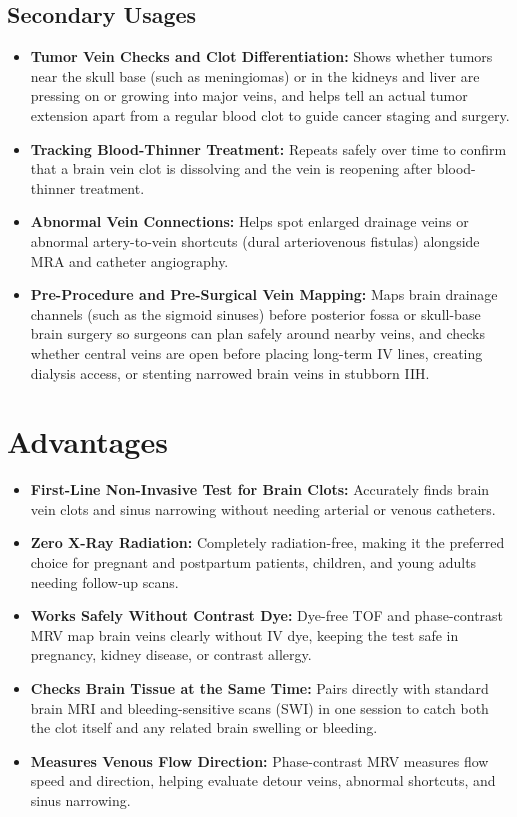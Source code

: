 \subsection{Secondary Usages}
\begin{itemize}
\item \textbf{Tumor Vein Checks and Clot Differentiation:} Shows whether tumors near the skull base (such as meningiomas) or in the kidneys and liver are pressing on or growing into major veins, and helps tell an actual tumor extension apart from a regular blood clot to guide cancer staging and surgery.
\item \textbf{Tracking Blood-Thinner Treatment:} Repeats safely over time to confirm that a brain vein clot is dissolving and the vein is reopening after blood-thinner treatment.
\item \textbf{Abnormal Vein Connections:} Helps spot enlarged drainage veins or abnormal artery-to-vein shortcuts (dural arteriovenous fistulas) alongside MRA and catheter angiography.
\item \textbf{Pre-Procedure and Pre-Surgical Vein Mapping:} Maps brain drainage channels (such as the sigmoid sinuses) before posterior fossa or skull-base brain surgery so surgeons can plan safely around nearby veins, and checks whether central veins are open before placing long-term IV lines, creating dialysis access, or stenting narrowed brain veins in stubborn IIH.
\end{itemize}

\section{Advantages}
\begin{itemize}
\item \textbf{First-Line Non-Invasive Test for Brain Clots:} Accurately finds brain vein clots and sinus narrowing without needing arterial or venous catheters.
\item \textbf{Zero X-Ray Radiation:} Completely radiation-free, making it the preferred choice for pregnant and postpartum patients, children, and young adults needing follow-up scans.
\item \textbf{Works Safely Without Contrast Dye:} Dye-free TOF and phase-contrast MRV map brain veins clearly without IV dye, keeping the test safe in pregnancy, kidney disease, or contrast allergy.
\item \textbf{Checks Brain Tissue at the Same Time:} Pairs directly with standard brain MRI and bleeding-sensitive scans (SWI) in one session to catch both the clot itself and any related brain swelling or bleeding.
\item \textbf{Measures Venous Flow Direction:} Phase-contrast MRV measures flow speed and direction, helping evaluate detour veins, abnormal shortcuts, and sinus narrowing.
\end{itemize}


